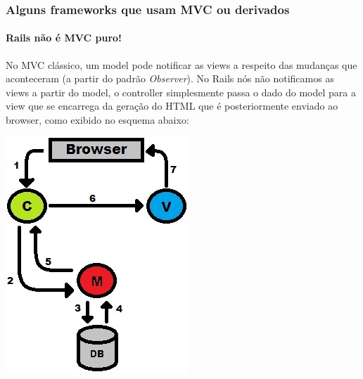 \documentclass{beamer}
\begin{document}
\begin{frame}
\frametitle{Alguns frameworks que usam MVC ou derivados}
\framesubtitle{Rails não é MVC puro!}
	No MVC clássico, um model pode notificar as views a respeito das mudanças que aconteceram (a partir do padrão \textit{Observer}). No Rails
	nós não notificamos as views a partir do model, o controller simplesmente passa o dado do model para a view que se encarrega da geração do HTML que
	é posteriormente enviado ao browser, como exibido no esquema abaixo:
	\begin{center}
		\includegraphics[scale=0.35]{RailsMVC.jpg}
	\end{center}
\end{frame}
\end{document}
